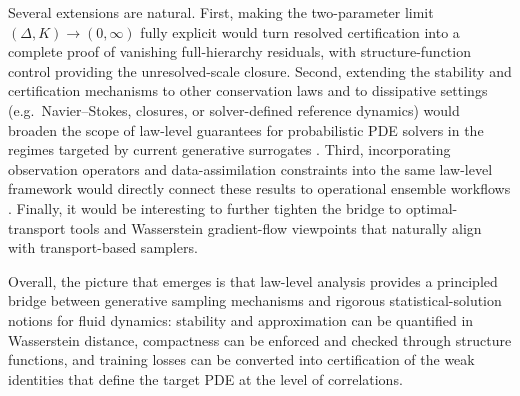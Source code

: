 \documentclass{article}
\numberwithin{equation}{section}
\theoremstyle{plain}
\theoremstyle{definition}
\theoremstyle{remark}
\begin{document}
Several extensions are natural. First, making the two-parameter limit $(\Delta,K)\to(0,\infty)$ fully explicit would turn
resolved certification into a complete proof of vanishing full-hierarchy residuals, with structure-function control
providing the unresolved-scale closure. Second, extending the stability and certification mechanisms to other conservation
laws and to dissipative settings (e.g.\ Navier--Stokes, closures, or solver-defined reference dynamics) would broaden the
scope of law-level guarantees for probabilistic PDE solvers in the regimes targeted by current generative surrogates
\cite{price2023gencast,larsson2025diffusion,du2024conditional,gao2024bayesian}. Third, incorporating observation operators
and data-assimilation constraints into the same law-level framework would directly connect these results to operational
ensemble workflows \cite{price2025probabilistic,lang2026aifs,mahesh2024huge2}. Finally, it would be interesting to further
tighten the bridge to optimal-transport tools and Wasserstein gradient-flow viewpoints \cite{figalli2021invitation} that
naturally align with transport-based samplers.

Overall, the picture that emerges is that law-level analysis provides a principled bridge between generative sampling
mechanisms and rigorous statistical-solution notions for fluid dynamics: stability and approximation can be quantified in
Wasserstein distance, compactness can be enforced and checked through structure functions, and training losses can be
converted into certification of the weak identities that define the target PDE at the level of correlations.



\printbibliography
\end{document}
